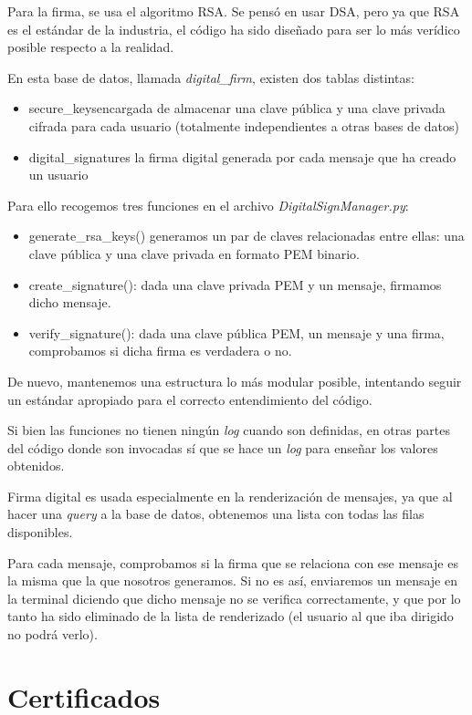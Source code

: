 \documentclass[a4paper,11pt]{article}
\begin{document}
Para la firma, se usa el algoritmo RSA. Se pensó en usar DSA, pero ya que RSA es el estándar de la industria, el código ha sido diseñado para ser lo más verídico posible respecto a la realidad.

En esta base de datos, llamada \textit{digital\_firm}, existen dos tablas distintas:
\begin{itemize}
    \item secure\_keys\:encargada de almacenar una clave pública y una clave privada cifrada para cada usuario (totalmente independientes a otras bases de datos)
    \item digital\_signatures\: la firma digital generada por cada mensaje que ha creado un usuario
\end{itemize}

Para ello recogemos tres funciones en el archivo \textit{DigitalSignManager.py}:
\begin{itemize}
    \item generate\_rsa\_keys()\: generamos un par de claves relacionadas entre ellas: una clave pública y una clave privada en formato PEM binario.
    \item create\_signature(): dada una clave privada PEM y un mensaje, firmamos dicho mensaje.
    \item verify\_signature(): dada una clave pública PEM, un mensaje y una firma, comprobamos si dicha firma es verdadera o no.
\end{itemize}

De nuevo, mantenemos una estructura lo más modular posible, intentando seguir un estándar apropiado para el correcto entendimiento del código. 

Si bien las funciones no tienen ningún \textit{log} cuando son definidas, en otras partes del código donde son invocadas sí que se hace un \textit{log} para enseñar los valores obtenidos.

Firma digital es usada especialmente en la renderización de mensajes, ya que al hacer una \textit{query} a la base de datos, obtenemos una lista con todas las filas disponibles. 

Para cada mensaje, comprobamos si la firma que se relaciona con ese mensaje es la misma que la que nosotros generamos. Si no es así, enviaremos un mensaje en la terminal diciendo que dicho mensaje no se verifica correctamente, y que por lo tanto ha sido eliminado de la lista de renderizado (el usuario al que iba dirigido no podrá verlo).

\section{Certificados}
\label{sec:firmaDigital}
\end{document}
